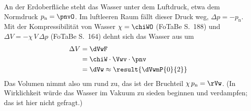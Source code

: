 An der Erdoberfläche steht das Wasser unter dem Luftdruck, etwa dem Normdruck $p_\mathrm{n} = \pnvO$. Im luftleeren Raum fällt dieser Druck weg, $\Delta p = -p_\mathrm{n}$. Mit der Kompressibilität von Wasser $\chi = \chiWO$ (FoTaBe S.~188) und $\Delta V = -\chi\,V\,\Delta p$ (FoTaBe S.~164) dehnt sich das Wasser aus um
\begin{align}
 \Delta V &= \dVwF \\
   &= \chiW\cdot\Vwv\cdot\pnv \\
   &= \dVw \approx \result{\dVwmP{0}{2}}
\end{align}
Das Volumen nimmt also um rund  zu, das ist der Bruchteil $\chi\,p_\mathrm{n} = \rVw$. (In Wirklichkeit würde das Wasser im Vakuum zu sieden beginnen und verdampfen; das ist hier nicht gefragt.)
